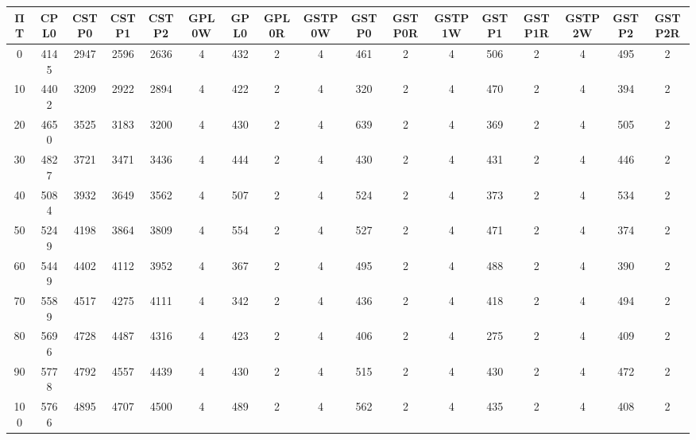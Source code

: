 \begin{tabular}{|c|c|c|c|c|c|c|c|c|c|c|c|c|c|c|c|c|}
\hline
ΠΤ&CPL0&CSTP0&CSTP1&CSTP2&GPL0W&GPL0&GPL0R&GSTP0W&GSTP0&GSTP0R&GSTP1W&GSTP1&GSTP1R&GSTP2W&GSTP2&GSTP2R\\\hline
\hline
0&4145&2947&2596&2636&4&432&2&4&461&2&4&506&2&4&495&2\\
\hline
10&4402&3209&2922&2894&4&422&2&4&320&2&4&470&2&4&394&2\\
\hline
20&4650&3525&3183&3200&4&430&2&4&639&2&4&369&2&4&505&2\\
\hline
30&4827&3721&3471&3436&4&444&2&4&430&2&4&431&2&4&446&2\\
\hline
40&5084&3932&3649&3562&4&507&2&4&524&2&4&373&2&4&534&2\\
\hline
50&5249&4198&3864&3809&4&554&2&4&527&2&4&471&2&4&374&2\\
\hline
60&5449&4402&4112&3952&4&367&2&4&495&2&4&488&2&4&390&2\\
\hline
70&5589&4517&4275&4111&4&342&2&4&436&2&4&418&2&4&494&2\\
\hline
80&5696&4728&4487&4316&4&423&2&4&406&2&4&275&2&4&409&2\\
\hline
90&5778&4792&4557&4439&4&430&2&4&515&2&4&430&2&4&472&2\\
\hline
100&5766&4895&4707&4500&4&489&2&4&562&2&4&435&2&4&408&2\\
\hline
\end{tabular}

